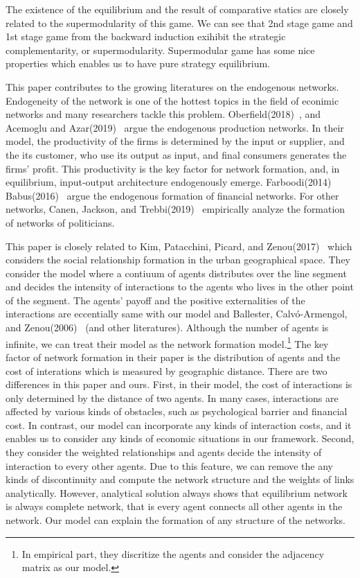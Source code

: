 \documentclass[12pt]{article}
\theoremstyle{definition}
\begin{document}
The existence of the equilibrium and the result of comparative statics are closely related to the supermodularity of this game.
We can see that 2nd stage game and 1st stage game from the backward induction exihibit the strategic complementarity, or supermodularity.
Supermodular game has some nice properties which enables us to have pure strategy equilibrium.

This paper contributes to the growing literatures on the endogenous networks.
Endogeneity of the network is one of the hottest topics in the field of econimic networks and many researchers tackle this problem.
Oberfield(2018)~\cite{ober}, and Acemoglu and Azar(2019)~\cite{endo_net} argue the endogenous production networks.
In their model, the productivity of the firms is determined by the input or supplier, and the its customer, who use its output as input, and final consumers generates the firms' profit.
This productivity is the key factor for network formation, and, in equilibrium, input-output architecture endogenously emerge.
Farboodi(2014)~\cite{farboodi} Babus(2016)~\cite{babus} argue the endogenous formation of financial networks.
For other networks, Canen, Jackson, and Trebbi(2019)~\cite{canen} empirically analyze the formation of networks of politicians.

This paper is closely related to Kim, Patacchini, Picard, and Zenou(2017)~\cite{Urban} which considers the social relationship formation in the urban geographical space.
They consider the model where a contiuum of agents distributes over the line segment and decides the intensity of interactions to the agents who lives in the other point of the segment.
The agents' payoff and the positive externalities of the interactions are eccentially same with our model and Ballester, Calv\'{o}-Armengol, and Zenou(2006)~\cite{whowho} (and other literatures).
Although the number of agents is infinite, we can treat their model as the network formation model.\footnote{In empirical part, they discritize the agents and consider the adjacency matrix as our model.}
The key factor of network formation in their paper is the distribution of agents and the cost of interations which is measured by geographic distance.
There are two differences in this paper and ours.
First, in their model, the cost of interactions is only determined by the distance of two agents.
In many cases, interactions are affected by various kinds of obstacles, such as psychological barrier and financial cost.
In contrast, our model can incorporate any kinds of interaction costs, and it enables us to consider any kinds of economic situations in our framework.
Second, they consider the weighted relationships and agents decide the intensity of interaction to every other agents.
Due to this feature, we can remove the any kinds of discontinuity and compute the network structure and the weights of links analytically.
However, analytical solution always shows that equilibrium network is always complete network, that is every agent connects all other agents in the network.
Our model can explain the formation of any structure of the networks.
\end{document}
